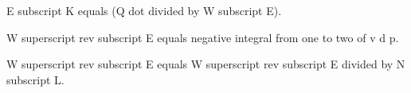 E subscript K equals (Q dot divided by W subscript E).  

W superscript rev subscript E equals negative integral from one to two of v d p.  

W superscript rev subscript E equals W superscript rev subscript E divided by N subscript L.